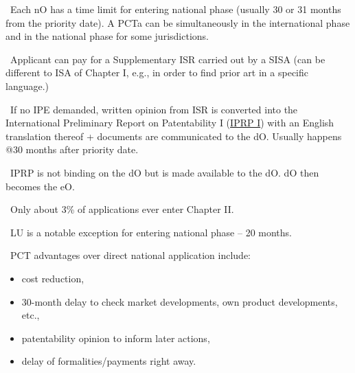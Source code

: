\documentclass{report}
\newcommand{\n}{\newline}
\newcommand{\p}{\adforn{61} \ }
\begin{document}
\p Each nO has a time limit for entering national phase (usually 30 or 31 months from the priority date). A PCTa can be simultaneously in the international phase and in the national phase for some jurisdictions. \n

\vspace{5mm}


\vspace{5mm}

\p Applicant can pay for a Supplementary ISR carried out by a SISA (can be different to ISA of Chapter I, e.g., in order to find prior art in a specific language.) \n

\p If no IPE demanded, written opinion from ISR is converted into the International Preliminary Report on Patentability I (\underline{IPRP I}) with an English translation thereof + documents are communicated to the dO. Usually happens @30 months after priority date.\n

\p IPRP is not binding on the dO but is made available to the dO. dO then becomes the eO.\n

\p Only about 3\% of applications ever enter Chapter II. \n


\p \textsc{LU} is a notable exception for entering national phase -- 20 months. \n

\p PCT advantages over direct national application include: 

\begin{itemize}
 \item cost reduction,
 \item 30-month delay to check market developments, own product developments, etc.,
 \item patentability opinion to inform later actions,
 \item delay of formalities/payments right away.
\end{itemize}
\end{document}
